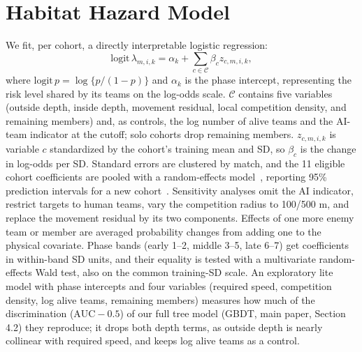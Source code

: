 \documentclass[sigconf,anonymous,nonacm]{acmart}
\begin{document}
\section{Habitat Hazard Model}
We fit, per cohort, a directly interpretable logistic regression:
\begin{equation}
\mathrm{logit}\,\lambda_{m,i,k}=\alpha_k+\textstyle\sum_{c\in\mathcal{C}}\beta_c z_{c,m,i,k},
\label{eq:ehm}
\end{equation}
where $\mathrm{logit}\,p=\log\{p/(1-p)\}$ and $\alpha_k$ is the phase intercept, representing the risk level shared by its teams on the log-odds scale.
$\mathcal{C}$ contains five variables (outside depth, inside depth, movement residual, local competition density, and remaining members) and, as controls, the log number of alive teams and the AI-team indicator at the cutoff; solo cohorts drop remaining members.
$z_{c,m,i,k}$ is variable $c$ standardized by the cohort's training mean and SD, so $\beta_c$ is the change in log-odds per SD.
Standard errors are clustered by match, and the 11 eligible cohort coefficients are pooled with a random-effects model~\cite{DerSimonian86}, reporting 95\% prediction intervals for a new cohort~\cite{Higgins09}. Sensitivity analyses omit the AI indicator, restrict targets to human teams, vary the competition radius to 100/500 m, and replace the movement residual by its two components. Effects of one more enemy team or member are averaged probability changes from adding one to the physical covariate.
Phase bands (early 1--2, middle 3--5, late 6--7) get coefficients in within-band SD units, and their equality is tested with a multivariate random-effects Wald test, also on the common training-SD scale.
An exploratory lite model with phase intercepts and four variables (required speed, competition density, log alive teams, remaining members) measures how much of the discrimination ($\mathrm{AUC}-0.5$) of our full tree model (GBDT, main paper, Section 4.2) they reproduce; it drops both depth terms, as outside depth is nearly collinear with required speed, and keeps log alive teams as a control.
\end{document}
